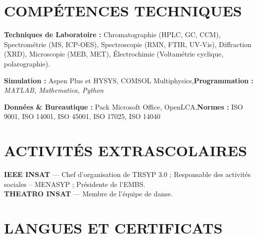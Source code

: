 \documentclass[10pt]{article}
\begin{document}
\section{COMPÉTENCES TECHNIQUES}
\begin{bul}
\item \textbf{Techniques de Laboratoire :} Chromatographie (HPLC, GC, CCM), Spectrométrie (MS, ICP-OES), Spectroscopie (RMN, FTIR, UV-Vis), Diffraction (XRD), Microscopie (MEB, MET), Électrochimie (Voltamétrie cyclique, polarographie).
\item \textbf{Simulation :} Aspen Plus et HYSYS, COMSOL Multiphysics\sep\textbf{Programmation :} \textit{MATLAB, Mathematica, Python}
\item \textbf{Données \& Bureautique :} Pack Microsoft Office, OpenLCA\sep\textbf{Normes :} ISO 9001, ISO 14001, ISO 45001, ISO 17025, ISO 14040
\end{bul}

\section{ACTIVITÉS EXTRASCOLAIRES}
\textbf{IEEE INSAT} — Chef d'organisation de TRSYP 3.0 ; Responsable des activités sociales – MENASYP ; Présidente de l'EMBS.\\
\textbf{THEATRO INSAT} — Membre de l'équipe de danse.\par

\section{LANGUES ET CERTIFICATS}
\end{document}
